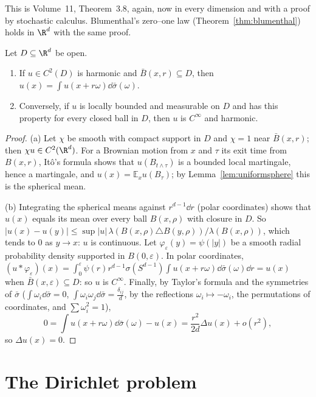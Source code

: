 This is Volume~11, Theorem~3.8, again, now in every dimension and with a proof by stochastic calculus. Blumenthal's zero--one law (Theorem~\ref{thm:blumenthal}) holds in $\R^d$ with the same proof.

\begin{lemma}\label{lem:meanvalue}
Let $D\subseteq\R^d$ be open.
\begin{enumerate}[label=(\alph*)]
\item If $u\in C^2(D)$ is harmonic and $\bar B(x,r)\subseteq D$, then $u(x)=\int u(x+r\omega)\dd\bar\sigma(\omega)$.
\item Conversely, if $u$ is locally bounded and measurable on $D$ and has this property for every closed ball in $D$, then $u$ is $C^\infty$ and harmonic.
\end{enumerate}
\end{lemma}

\begin{proof}
(a) Let $\chi$ be smooth with compact support in $D$ and $\chi=1$ near $\bar B(x,r)$; then $\chi u\in C^2(\R^d)$. For a Brownian motion from $x$ and $\tau$ its exit time from $B(x,r)$, It\^o's formula shows that $u(B_{t\wedge\tau})$
is a bounded local martingale, hence a martingale, and $u(x)=\mathbb E_xu(B_\tau)$; by Lemma~\ref{lem:uniformsphere} this is the spherical mean.

(b) Integrating the spherical means against $r^{d-1}\dd r$ (polar coordinates) shows that $u(x)$ equals its mean over every ball $B(x,\rho)$ with closure in $D$. So $|u(x)-u(y)|\le\sup|u|\,\lambda(B(x,\rho)\triangle B(y,\rho))/\lambda(B(x,\rho))$,
which tends to $0$ as $y\to x$: $u$ is continuous. Let $\varphi_\varepsilon(y)=\psi(|y|)$ be a smooth radial probability density supported in $B(0,\varepsilon)$. In polar coordinates,
$(u*\varphi_\varepsilon)(x)=\int_0^\varepsilon\psi(r)r^{d-1}\sigma(S^{d-1})\int u(x+r\omega)\dd\bar\sigma(\omega)\dd r=u(x)$ when $\bar B(x,\varepsilon)\subseteq D$: so $u$ is $C^\infty$. Finally, by Taylor's formula and the
symmetries of $\bar\sigma$ ($\int\omega_i\dd\bar\sigma=0$, $\int\omega_i\omega_j\dd\bar\sigma=\frac{\delta_{ij}}d$, by the reflections $\omega_i\mapsto-\omega_i$, the permutations of coordinates, and $\sum\omega_i^2=1$),
\[
0=\int u(x+r\omega)\dd\bar\sigma(\omega)-u(x)=\frac{r^2}{2d}\Delta u(x)+o(r^2),
\]
so $\Delta u(x)=0$.
\end{proof}

\section{The Dirichlet problem}

